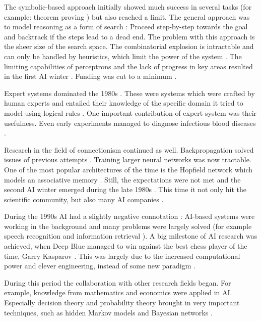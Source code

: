 \documentclass[draft,final,oneside]{vutinfth} %
\begin{document}
The symbolic-based approach initially showed much success in several tasks (for example: theorem proving \cite{aimodern}) but also reached a limit. The general approach was to model reasoning as a form of search \cite{aimodern}
: Proceed step-by-step towards the goal and backtrack if the steps lead to a dead end. The problem with this approach is the sheer size of the search space. The combinatorial explosion is intractable and can only be handled by heuristics, which limit the power of the system \cite{aimodern}. The limiting capabilities of perceptrons and the lack of progress in key areas resulted in the first AI winter \cite{crevier}. Funding was cut to a minimum \cite{crevier}.

Expert systems dominated the 1980s \cite{machineswhothink}. These were systems which were crafted by human experts and entailed their knowledge of the specific domain it tried to model using logical rules \cite{questforai}. One important contribution of expert system was their usefulness. Even early experiments managed to diagnose infectious blood diseases \cite{questforai}. 

Research in the field of connectionism continued as well. Backpropagation solved issues of previous attempts \cite{questforai}\cite{aimodern}. Training larger neural networks was now tractable. One of the most popular architectures of the time is the Hopfield network which models an associative memory \cite{anintroductiontoneuralnetworks}. Still, the expectations were not met and the second AI winter emerged during the late 1980s \cite{machineswhothink}. This time it not only hit the scientific community, but also many AI companies \cite{questforai}.

During the 1990s AI had a slightly negative connotation \cite{avoidai}: AI-based systems were working in the background and many problems were largely solved (for example speech recognition and information retrieval \cite{avoidai}\cite{historyinformationretrieval}). A big milestone of AI research was achieved, when Deep Blue managed to win against the best chess player of the time, Garry Kasparov \cite{questforai}. This was largely due to the increased computational power and clever engineering, instead of some new paradigm \cite{questforai}.

During this period the collaboration with other research fields began\cite{aimodern}. For example, knowledge from mathematics and economics were applied in AI. Especially decision theory and probability theory brought in very important techniques, such as hidden Markov models and Bayesian networks \cite{statisticsinml}\cite{aimodern}.
\end{document}

